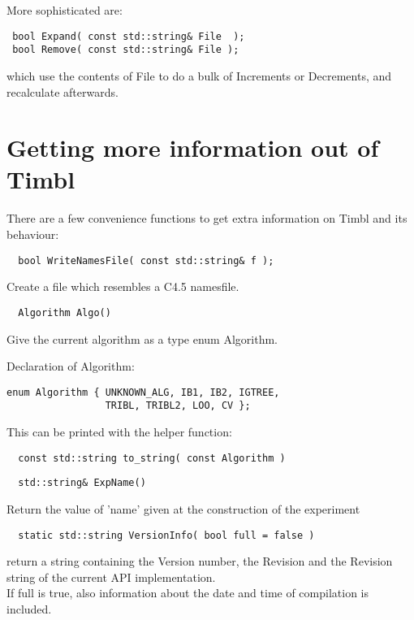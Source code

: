 More sophisticated are:
\begin{verbatim}
 bool Expand( const std::string& File  );
 bool Remove( const std::string& File );
\end{verbatim}

which use the contents of File to do a bulk of Increments or Decrements, and
recalculate afterwards.

\section{Getting more information out of Timbl}

There are a few convenience functions to get extra information on
Timbl and its behaviour:

\begin{verbatim}
  bool WriteNamesFile( const std::string& f );
\end{verbatim}

Create a file which resembles a C4.5 namesfile.

\begin{verbatim}
  Algorithm Algo()
\end{verbatim}

Give the current algorithm as a type enum Algorithm.

Declaration of Algorithm:
\begin{verbatim}
enum Algorithm { UNKNOWN_ALG, IB1, IB2, IGTREE, 
                 TRIBL, TRIBL2, LOO, CV };
\end{verbatim}

This can be printed with the helper function: 
\begin{verbatim}
  const std::string to_string( const Algorithm )
\end{verbatim}

\begin{verbatim}
  std::string& ExpName()
\end{verbatim}

Return the value of 'name' given at the construction of the experiment


\begin{verbatim}
  static std::string VersionInfo( bool full = false )
\end{verbatim}

return a string containing the Version number, the Revision and the
Revision string of the current API implementation.\\
If full is true, also information about the date and time of
compilation is included.

